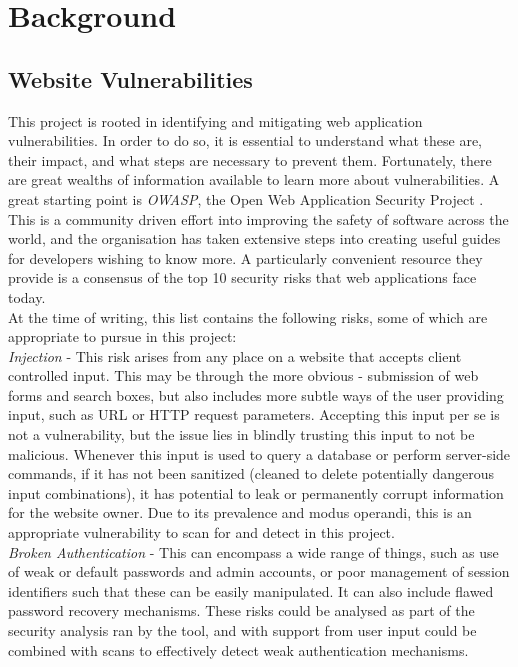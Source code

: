 \chapter{Background}

\section {Website Vulnerabilities}

This project is rooted in identifying and mitigating web application vulnerabilities. In order to do so, it is essential to understand what these are, their impact, and what steps are necessary to prevent them. Fortunately, there are great wealths of information available to learn more about vulnerabilities. A great starting point is \textit{OWASP}, the Open Web Application Security Project \cite{owaspPage}. This is a community driven effort into improving the safety of software across the world, and the organisation has taken extensive steps into creating useful guides for developers wishing to know more. A particularly convenient resource they provide is a consensus of the top 10 security risks that web applications face today. \\

At the time of writing, this list contains the following risks, some of which are appropriate to pursue in this project: \\

	\emph{Injection} - This risk arises from any place on a website that accepts client controlled input. This may be through the more obvious - submission of web forms and search boxes, but also includes more subtle ways of the user providing input, such as URL or HTTP request parameters. Accepting this input per se is not a vulnerability, but the issue lies in blindly trusting this input to not be malicious. Whenever this input is used to query a database or perform server-side commands, if it has not been sanitized (cleaned to delete potentially dangerous input combinations), it has potential to leak or permanently corrupt information for the website owner. Due to its prevalence and modus operandi, this is an appropriate vulnerability to scan for and detect in this project. \\
	
	\emph{Broken Authentication} - This can encompass a wide range of things, such as use of weak or default passwords and admin accounts, or poor management of session identifiers such that these can be easily manipulated. It can also include flawed password recovery mechanisms. These risks could be analysed as part of the security analysis ran by the tool, and with support from user input could be combined with scans to effectively detect weak authentication mechanisms. \\
	
